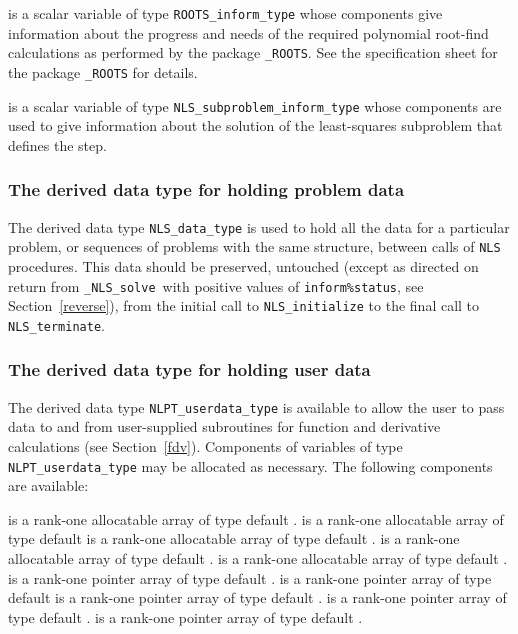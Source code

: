 \documentclass{galahad}
\newcommand{\packagename}{NLS}
\newcommand{\fullpackagename}{\libraryname\_\packagename}
\newcommand{\solver}{{\tt \fullpackagename\_solve}}
\begin{document}
\begin{description}
 is a scalar variable of type
{\tt ROOTS\_inform\_type}
whose components give information about the progress and needs
of the required polynomial root-find calculations
as performed by the package
{\tt \libraryname\_ROOTS}.
See the specification sheet for the package
{\tt \libraryname\_ROOTS} for details.

  is a scalar variable of type
{\tt \packagename\_subproblem\_inform\_type}
whose components are used to give information about the solution of the
least-squares subproblem that defines the step.
\end{description}


\subsubsection{The derived data type for holding problem data}\label{typedata}
The derived data type
{\tt \packagename\_data\_type}
is used to hold all the data for a particular problem,
or sequences of problems with the same structure, between calls of
{\tt \packagename} procedures.
This data should be preserved, untouched (except as directed on
return from \solver\ with positive values of {\tt inform\%status}, see
Section~\ref{reverse}),
from the initial call to
{\tt \packagename\_initialize}
to the final call to
{\tt \packagename\_terminate}.


\subsubsection{The derived data type for holding user data}\label{typeuserdata}
The derived data type
{\tt NLPT\_userdata\_type}
is available to allow the user to pass data to and from user-supplied
subroutines for function and derivative calculations (see Section~\ref{fdv}).
Components of variables of type {\tt NLPT\_userdata\_type} may be allocated as
necessary. The following components are available:

\begin{description}
 is a rank-one allocatable array of type default \integer.
 is a rank-one allocatable array of type default  \realdp
{} is a rank-one allocatable array of type default \complexdp.
 is a rank-one allocatable array of type default \character.
 is a rank-one allocatable array of type default \logical.
 is a rank-one pointer array of type default \integer.
 is a rank-one pointer array of type default  \realdp
{} is a rank-one pointer array of type default \complexdp.
 is a rank-one pointer array of type default \character.
 is a rank-one pointer array of type default \logical.
\end{description}
\end{document}
